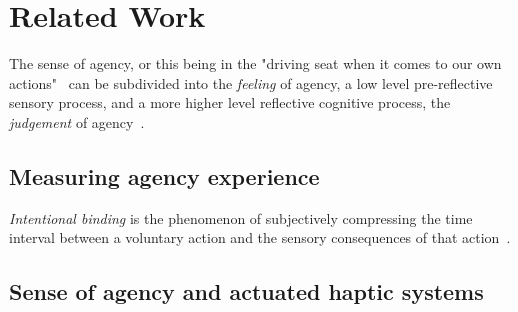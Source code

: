 \section{Related Work}


The sense of agency, or this being in the "driving seat when it comes to our own actions"~\cite{Moore2016-ub} can be subdivided into the \textit{feeling} of agency, a low level pre-reflective sensory process, and a more higher level reflective cognitive process, the \textit{judgement} of agency~\cite{Moore2016-ub, Danry2022-xk}. 

\subsection{Measuring agency experience}




\textit{Intentional binding} is the phenomenon of subjectively compressing the time interval between a voluntary action and the sensory consequences of that action~\cite{Moore2012-ic}.

\subsection{Sense of agency and actuated haptic systems}

